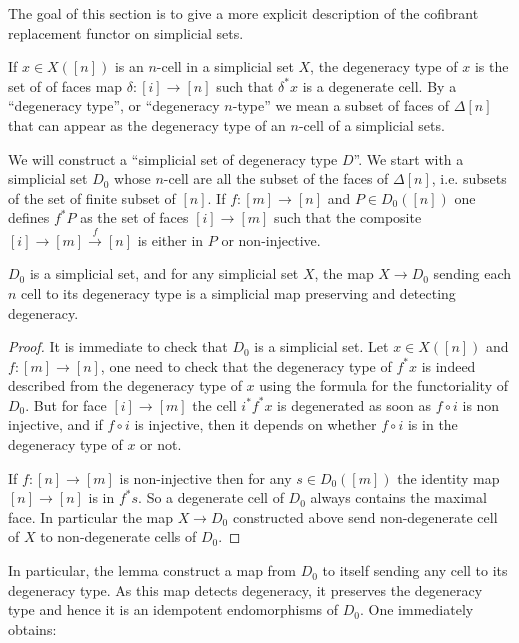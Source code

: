 \documentclass[reqno,10pt,a4paper,oneside,draft]{amsart}
\begin{document}
The goal of this section is to give a more explicit description of the cofibrant replacement functor on simplicial sets.


\begin{definition}
If $x \in X([n])$ is an $n$-cell in a simplicial set $X$, the degeneracy type of $x$ is the set of of faces map $\delta:[i] \rightarrow [n]$ such that $\delta^* x$ is a degenerate cell. 
By a ``degeneracy type'', or ``degeneracy $n$-type'' we mean a subset of faces of $\Delta[n]$ that can appear as the degeneracy type of an $n$-cell of a simplicial sets.
\end{definition}

We will construct a ``simplicial set of degeneracy type $D$''. We start with a simplicial set $D_0$ whose $n$-cell are all the subset of the faces of $\Delta[n]$, i.e. subsets of the set of finite subset of $[n]$. If $f : [m] \rightarrow [n]$ and $P \in D_0([n])$ one defines $f^* P$ as the set of faces  $[i] \rightarrow [m]$ such that the composite $[i] \rightarrow [m] \overset{f}{\rightarrow} [n]$ is either in $P$ or non-injective.

\begin{lemma}
$D_0$ is a simplicial set, and for any simplicial set $X$, the map $X \rightarrow D_0$ sending each $n$ cell to its degeneracy type is a simplicial map preserving and detecting degeneracy.
\end{lemma}

\begin{proof}
It is immediate to check that $D_0$ is a simplicial set. Let $x \in X([n])$ and $f:[m] \rightarrow [n]$, one need to check that the degeneracy type of $f^* x$ is indeed described from the degeneracy type of $x$ using the formula for the functoriality of $D_0$. But for face $[i] \rightarrow [m]$ the cell $i^* f^* x$ is degenerated as soon as $f \circ i$ is non injective, and if $f\circ i$ is injective, then it depends on whether $f \circ i$ is in the degeneracy type of $x$ or not.

If $f:[n] \rightarrow [m]$ is non-injective then for any $s \in D_0([m])$ the identity map $[n] \rightarrow [n]$ is in $f^* s$. So a degenerate cell of $D_0$ always contains the maximal face. In particular the map $X \rightarrow D_0$ constructed above send non-degenerate cell of $X$ to non-degenerate cells of $D_0$.

\end{proof}

In particular, the lemma construct a map from $D_0$ to itself sending any cell to its degeneracy type. As this map detects degeneracy, it preserves the degeneracy type and hence it is an idempotent endomorphisms of $D_0$. One immediately obtains:
\end{document}
